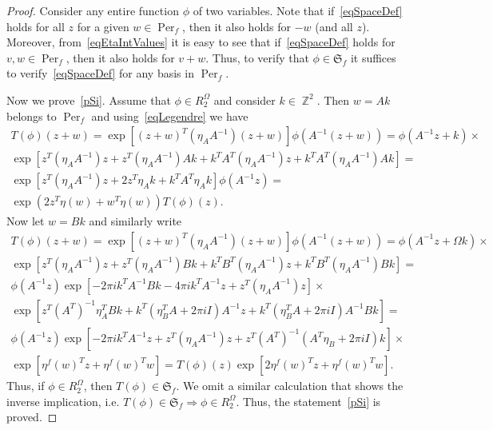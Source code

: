 \documentclass{amsart}
\numberwithin{equation}{section}
\theoremstyle{definition}
\theoremstyle{remark}
\DeclareMathOperator{\ZZ}{\mathbb Z}
\DeclareMathOperator{\Per}{Per}
\begin{document}
	\begin{proof}
		Consider any entire function $\phi$ of two variables. Note that if~\eqref{eqSpaceDef} holds for all $z$ for a given $w \in \Per_f$, then it also holds for $-w$ (and all $z$). Moreover, from~\eqref{eqEtaIntValues} it is easy to see that if~\eqref{eqSpaceDef} holds for $v,w \in \Per_f$, then it also holds for $v + w$. Thus, to verify that $\phi \in \mathfrak S_f$ it suffices to verify~\eqref{eqSpaceDef} for any basis in $\Per_f$. 
		
		Now we prove~\ref{pSi}. Assume that $\phi \in R^\Omega_2$ and consider $k \in \ZZ^2$. Then $w = Ak$ belongs to $\Per_f$ and using~\eqref{eqLegendre} we have
		\begin{multline*}
			T(\phi)(z + w) = \exp\left[(z + w)^T(\eta_A A^{-1})(z + w)\right]\phi(A^{-1}(z + w)) = \phi(A^{-1}z + k) \times \\ \exp\left[z^T(\eta_A A^{-1})z + z^T(\eta_A A^{-1})Ak + k^TA^T(\eta_A A^{-1})z + k^TA^T(\eta_A A^{-1})Ak\right] = \\
			\exp\left[z^T(\eta_A A^{-1})z + 2z^T\eta_Ak  + k^TA^T\eta_A k\right]\phi(A^{-1}z) = \\ \exp(2z^T\eta(w) + w^T\eta(w))T(\phi)(z).
		\end{multline*}
		Now let $w = Bk$ and similarly write
		\begin{multline*}
			T(\phi)(z + w)=\exp\left[(z + w)^T(\eta_A A^{-1})(z + w)\right]\phi(A^{-1}(z + w)) =\phi(A^{-1}z + \Omega k)\times \\ \exp\left[z^T(\eta_A A^{-1})z + z^T(\eta_A A^{-1})Bk + k^TB^T(\eta_A A^{-1})z + k^TB^T(\eta_A A^{-1})Bk\right] = \\
			\phi(A^{-1}z)\exp\left[-2\pi i k^T A^{-1}Bk - 4\pi i k^T A^{-1}z + z^T (\eta_A A^{-1})z\right] \times \\
			\exp\left[ z^T \left(A^T\right)^{-1}\eta_A^TBk + k^T(\eta_B^T A + 2\pi i I)A^{-1}z + k^T(\eta_B^T A + 2\pi i I)A^{-1}Bk \right] = \\
			\phi(A^{-1}z)\exp\left[-2\pi i k^T A^{-1}z + z^T (\eta_A A^{-1})z + z^T \left(A^T\right)^{-1}(A^T \eta_B + 2\pi i I)k\right] \times \\ \exp\left[\eta^f(w)^Tz + \eta^f(w)^Tw\right] = T(\phi)(z) \exp\left[2\eta^f(w)^Tz + \eta^f(w)^Tw\right].
		\end{multline*}
		Thus, if $\phi \in R_2^\Omega$, then $T(\phi) \in \mathfrak S_f$. We omit a similar calculation that shows the inverse implication, i.e. $T(\phi) \in \mathfrak S_f \Rightarrow \phi \in R_2^\Omega$. Thus, the statement~\ref{pSi} is proved.
		

\end{proof}
\end{document}
